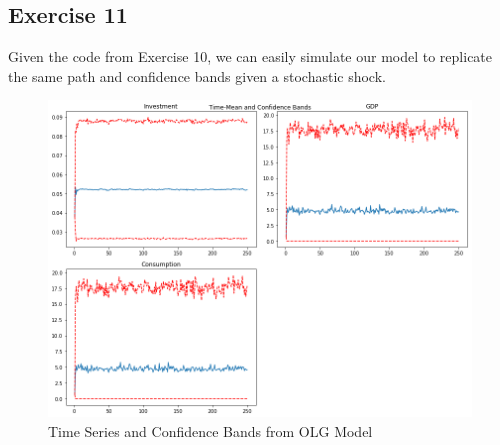 \documentclass{article}
\begin{document}
    \newpage
    \subsection*{Exercise 11}
    Given the code from Exercise 10, we can easily simulate our model to replicate the same path and confidence bands given a stochastic shock.
    
    \begin{figure}[!h]
    	\centering
    	\caption{Time Series and Confidence Bands from OLG Model}
    	\includegraphics[scale = 0.5]{fig8}
    \end{figure}
 
\end{document}

